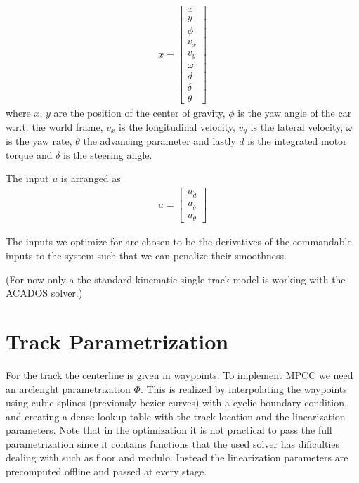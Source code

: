 \documentclass[12pt]{article}
\begin{document}
\begin{align}
x = \begin{bmatrix}
x\\
y\\
\phi\\
v_x\\
v_y\\
\omega\\
d\\
\delta\\
\theta
\end{bmatrix}
\end{align}
where $x$, $y$ are the position of the center of gravity, $\phi$ is the yaw angle of the car w.r.t. the world frame, $v_x$ is the longitudinal velocity, $v_y$ is the lateral velocity, $\omega$ is the yaw rate, $\theta$ the advancing parameter and lastly $d$ is the integrated motor torque and $\delta$ is the steering angle.

The input $u$ is arranged as
\begin{align}
u = \begin{bmatrix}
u_{\dot{d}}\\
u_{\dot{\delta}}\\
u_{\dot{ \theta}}
\end{bmatrix}
\end{align} 

The inputs we optimize for are chosen to be the derivatives of the commandable inputs to the system such that we can penalize their smoothness.

\bigskip
(For now only a the standard kinematic single track model is working with the ACADOS solver.)

\section{Track Parametrization}

For the track the centerline is given in waypoints. To implement MPCC we need an arclenght parametrization $\Phi$. This is realized by interpolating the waypoints using cubic splines (previously bezier curves) with a cyclic boundary condition, and creating a dense lookup table with the track location and the linearization parameters. Note that in the optimization it is not practical to pass the  full parametrization since it contains functions that the used solver has dificulties dealing with such as floor and modulo. Instead the linearization parameters are precomputed offline and passed at every stage.   



\end{document}
